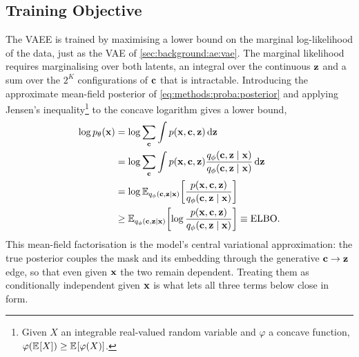 \subsection{Training Objective} \label{sec:methods:model:loss}

The \ac{VAEE} is trained by maximising a lower bound on the marginal
log-likelihood of the data, just as the \ac{VAE} of
\cref{sec:background:ae:vae}. The
marginal likelihood requires marginalising over both latents, an integral over
the continuous $\vb{z}$ and a sum over the $2^{K}$ configurations of $\vb{c}$
that is intractable. Introducing the approximate mean-field posterior of
\cref{eq:methods:proba:posterior} and applying Jensen's
inequality\footnote{Given $X$ an integrable real-valued random variable and
$\varphi$ a concave function, $\varphi(\E{X}) \ge \E{\varphi(X)}$.} to the
concave logarithm gives a lower bound,
\begin{equation*}
    \begin{split}
        \log p_{\theta}(\vb{x})
        &= \log \sum_{\vb{c}} \int p(\vb{x}, \vb{c}, \vb{z}) \dd{\vb{z}}\\
        &= \log \sum_{\vb{c}} \int p(\vb{x}, \vb{c}, \vb{z}) \frac{q_\phi(\vb{c}, \vb{z} \mid \vb{x})}{q_\phi(\vb{c}, \vb{z} \mid \vb{x})} \dd{\vb{z}}\\
        &= \log \E[q_\phi(\vb{c}, \vb{z} \mid \vb{x})]{\frac{p(\vb{x}, \vb{c}, \vb{z})}{q_\phi(\vb{c}, \vb{z} \mid \vb{x})}}\\
        &\ge \E[q_\phi(\vb{c}, \vb{z} \mid \vb{x})]{\log \frac{p(\vb{x}, \vb{c}, \vb{z})}{q_\phi(\vb{c}, \vb{z} \mid \vb{x})}} \equiv \mathrm{ELBO}.
    \end{split}
\end{equation*}
This mean-field factorisation is the model's central variational approximation:
the true posterior couples the mask and its embedding through the generative
$\vb{c} \to \vb{z}$ edge, so that even given $\vb{x}$ the two remain dependent.
Treating them as conditionally independent given $\vb{x}$ is what lets all three
terms below close in form.

